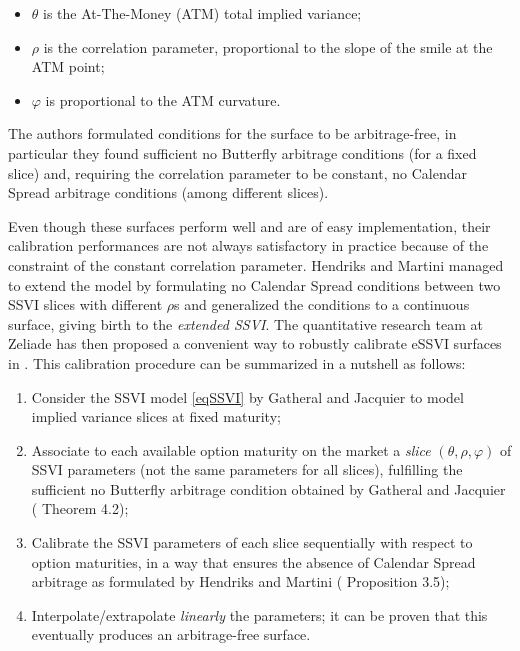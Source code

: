 \documentclass{article}
\providecommand{\tightlist}{%
      \setlength{\itemsep}{0pt}\setlength{\parskip}{0pt}}
\begin{document}
\begin{itemize}
\tightlist
\item
  \(\theta\) is the At-The-Money (ATM) total implied variance;
\item
  \(\rho\) is the correlation parameter, proportional to the slope of
  the smile at the ATM point;
\item
  \(\varphi\) is proportional to the ATM curvature.
\end{itemize}

The authors formulated conditions for the surface to be arbitrage-free,
in particular they found sufficient no Butterfly arbitrage conditions
(for a fixed slice) and, requiring the correlation parameter to be
constant, no Calendar Spread arbitrage conditions (among different
slices).

	Even though these surfaces perform well and are of easy implementation,
their calibration performances are not always satisfactory in practice
because of the constraint of the constant correlation parameter.
Hendriks and Martini \cite{hendriks2019extended} managed to extend the
model by formulating no Calendar Spread conditions between two SSVI
slices with different \(\rho\)s and generalized the conditions to a
continuous surface, giving birth to the \emph{extended SSVI}. The
quantitative research team at Zeliade has then proposed a convenient way
to robustly calibrate eSSVI surfaces in \cite{corbetta2019robust}. This
calibration procedure can be summarized in a nutshell as follows:

\begin{enumerate}
\def\labelenumi{\arabic{enumi}.}
\tightlist
\item
  Consider the SSVI model \cref{eqSSVI} by Gatheral and Jacquier to
  model implied variance slices at fixed maturity;
\item
  Associate to each available option maturity on the market a
  \emph{slice} \((\theta,\rho,\varphi)\) of SSVI parameters (not the
  same parameters for all slices), fulfilling the sufficient no
  Butterfly arbitrage condition obtained by Gatheral and Jacquier
  (\cite{gatheral2014arbitrage} Theorem 4.2);
\item
  Calibrate the SSVI parameters of each slice sequentially with respect
  to option maturities, in a way that ensures the absence of Calendar
  Spread arbitrage as formulated by Hendriks and Martini
  (\cite{hendriks2019extended} Proposition 3.5);
\item
  Interpolate/extrapolate \emph{linearly} the parameters; it can be
  proven that this eventually produces an arbitrage-free surface.
\end{enumerate}
\end{document}
